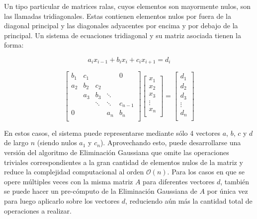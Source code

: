 Un tipo particular de matrices ralas, cuyos elementos son mayormente nulos, son las llamadas tridiagonales. Estas contienen elementos nulos por fuera de la diagonal principal y las diagonales adyacentes por encima y por debajo de la principal. Un sistema de ecuaciones tridiagonal y su matriz asociada tienen la forma:

\begin{equation} \label{eq:tridiagonal}
	a_{i} x_{i-1} + b_{i} x_{i} + c_{i} x_{i+1} = d_{i}
\end{equation}


\[
\begin{bmatrix}
b_{1} & c_{1} &  &  & 0 \\
a_{2} & b_{2} & c_{2} &  &  \\
 & a_{3} & b_{3} & \ddots &  \\
 &  & \ddots & \ddots & c_{n-1} \\
0 &  &  & a_{n} & b_{n} \\
\end{bmatrix}
\begin{bmatrix}
x_{1} \\
x_{2} \\
x_{3} \\
\vdots \\
x_{n} \\
\end{bmatrix}
=
\begin{bmatrix}
d_{1} \\
d_{2} \\
d_{3} \\
\vdots \\
d_{n} \\
\end{bmatrix}
\]

En estos casos, el sistema puede representarse mediante sólo 4 vectores $a$, $b$, $c$ y $d$ de largo $n$ (siendo nulos $a_{1}$ y $c_{n}$). Aprovechando esto, puede desarrollarse una versión del algoritmo de Eliminación Gaussiana que omite las operaciones triviales correspondientes a la gran cantidad de elementos nulos de la matriz y reduce la complejidad computacional al orden $\mathcal{O}(n)$. Para los casos en que se opere múltiples veces con la misma matriz $A$ para diferentes vectores $d$, también se puede hacer un pre-cómputo de la Eliminación Gaussiana de $A$ por única vez para luego aplicarlo sobre los vectores $d$, reduciendo aún más la cantidad total de operaciones a realizar.
